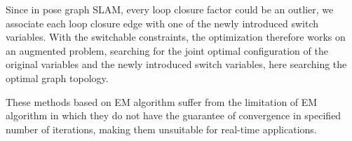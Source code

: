 Since in pose graph SLAM, every loop closure factor could be an outlier, we
associate each loop closure edge with one of the newly introduced switch
variables. With the switchable constraints, the optimization therefore works
on an augmented problem, searching for the joint optimal configuration of the
original variables and the newly introduced switch variables, here searching
the optimal graph topology. 

These methods based on EM algorithm suffer from the limitation of EM algorithm
in which they do not have the guarantee of convergence in specified number of
iterations, making them unsuitable for real-time applications.
